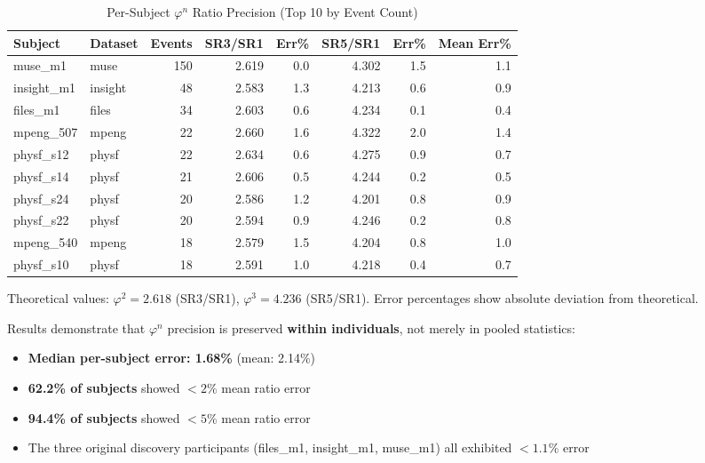 \documentclass[11pt,a4paper]{article}
\newcommand{\phisym}{\varphi}
\begin{document}
\begin{table}[H]
\centering
\begin{threeparttable}
\caption{Per-Subject $\phisym^n$ Ratio Precision (Top 10 by Event Count)}
\label{tab:per_subject_phi}
\begin{tabular}{@{}llrrrrrr@{}}
\toprule
Subject & Dataset & Events & SR3/SR1 & Err\% & SR5/SR1 & Err\% & Mean Err\% \\
\midrule
muse\_m1 & muse & 150 & 2.619 & 0.0 & 4.302 & 1.5 & 1.1 \\
insight\_m1 & insight & 48 & 2.583 & 1.3 & 4.213 & 0.6 & 0.9 \\
files\_m1 & files & 34 & 2.603 & 0.6 & 4.234 & 0.1 & 0.4 \\
mpeng\_507 & mpeng & 22 & 2.660 & 1.6 & 4.322 & 2.0 & 1.4 \\
physf\_s12 & physf & 22 & 2.634 & 0.6 & 4.275 & 0.9 & 0.7 \\
physf\_s14 & physf & 21 & 2.606 & 0.5 & 4.244 & 0.2 & 0.5 \\
physf\_s24 & physf & 20 & 2.586 & 1.2 & 4.201 & 0.8 & 0.9 \\
physf\_s22 & physf & 20 & 2.594 & 0.9 & 4.246 & 0.2 & 0.8 \\
mpeng\_540 & mpeng & 18 & 2.579 & 1.5 & 4.204 & 0.8 & 1.0 \\
physf\_s10 & physf & 18 & 2.591 & 1.0 & 4.218 & 0.4 & 0.7 \\
\bottomrule
\end{tabular}
\begin{tablenotes}
\small
\item Theoretical values: $\phisym^2 = 2.618$ (SR3/SR1), $\phisym^3 = 4.236$ (SR5/SR1). Error percentages show absolute deviation from theoretical.
\end{tablenotes}
\end{threeparttable}
\end{table}

Results demonstrate that $\phisym^n$ precision is preserved \textbf{within individuals}, not merely in pooled statistics:
\begin{itemize}
    \item \textbf{Median per-subject error: 1.68\%} (mean: 2.14\%)
    \item \textbf{62.2\% of subjects} showed $<2\%$ mean ratio error
    \item \textbf{94.4\% of subjects} showed $<5\%$ mean ratio error
    \item The three original discovery participants (files\_m1, insight\_m1, muse\_m1) all exhibited $<1.1\%$ error
\end{itemize}
\end{document}
